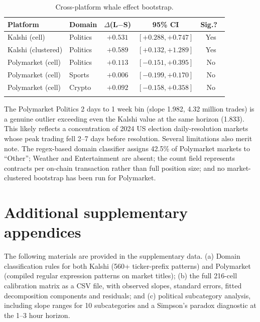 \documentclass[numsec,webpdf,modern,medium]{oup-authoring-template}
\theoremstyle{thmstyleone}%
\theoremstyle{thmstyletwo}%
\theoremstyle{thmstylethree}%
\begin{document}
\begin{appendices}
\begin{table}[!t]
\caption{Cross-platform whale effect bootstrap.\label{tab:cross_bootstrap}}%
\begin{tabular*}{\columnwidth}{@{\extracolsep\fill}llccc@{\extracolsep\fill}}
\toprule
Platform & Domain & $\Delta$(L$-$S) & 95\% CI & Sig.?\ \\
\midrule
Kalshi (cell)      & Politics & $+0.531$ & $[+0.288, +0.747]$ & Yes \\
Kalshi (clustered) & Politics & $+0.589$ & $[+0.132, +1.289]$ & Yes \\
Polymarket (cell)  & Politics & $+0.113$ & $[-0.151, +0.395]$ & No  \\
Polymarket (cell)  & Sports   & $+0.006$ & $[-0.199, +0.170]$ & No  \\
Polymarket (cell)  & Crypto   & $+0.092$ & $[-0.158, +0.358]$ & No  \\
\botrule
\end{tabular*}
\end{table}
The Polymarket Politics 2 days to 1 week bin (slope 1.982, 4.32 million trades) is a genuine outlier exceeding even the Kalshi value at the same horizon (1.833). This likely reflects a concentration of 2024 US election daily-resolution markets whose peak trading fell 2--7 days before resolution. Several limitations also merit note. The regex-based domain classifier assigns 42.5\% of Polymarket markets to ``Other''; Weather and Entertainment are absent; the count field represents contracts per on-chain transaction rather than full position size; and no market-clustered bootstrap has been run for Polymarket.
\section{Additional supplementary appendices}\label{app:additional}

The following materials are provided in the supplementary data. (a) Domain classification rules for both Kalshi (560+ ticker-prefix patterns) and Polymarket (compiled regular expression patterns on market titles); (b) the full 216-cell calibration matrix as a CSV file, with observed slopes, standard errors, fitted decomposition components and residuals; and (c) political subcategory analysis, including slope ranges for 10 subcategories and a Simpson's paradox diagnostic at the 1--3 hour horizon.

\end{appendices}
\end{document}
